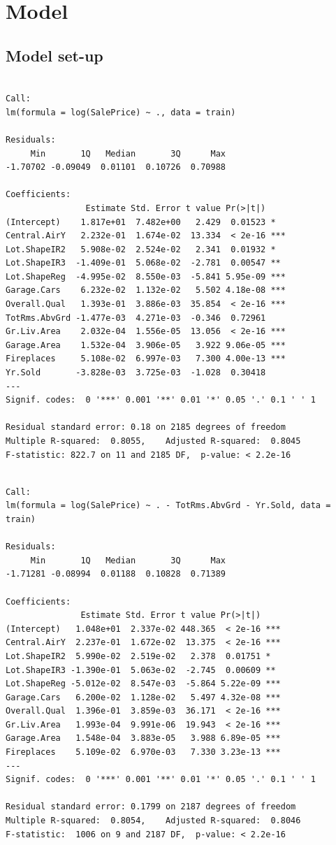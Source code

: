 \documentclass[
  letterpaper,
  DIV=11,
  numbers=noendperiod]{scrartcl}
\begin{document}
\section{Model}\label{model}

\subsection{Model set-up}\label{model-set-up}

\begin{verbatim}

Call:
lm(formula = log(SalePrice) ~ ., data = train)

Residuals:
     Min       1Q   Median       3Q      Max 
-1.70702 -0.09049  0.01101  0.10726  0.70988 

Coefficients:
                Estimate Std. Error t value Pr(>|t|)    
(Intercept)    1.817e+01  7.482e+00   2.429  0.01523 *  
Central.AirY   2.232e-01  1.674e-02  13.334  < 2e-16 ***
Lot.ShapeIR2   5.908e-02  2.524e-02   2.341  0.01932 *  
Lot.ShapeIR3  -1.409e-01  5.068e-02  -2.781  0.00547 ** 
Lot.ShapeReg  -4.995e-02  8.550e-03  -5.841 5.95e-09 ***
Garage.Cars    6.232e-02  1.132e-02   5.502 4.18e-08 ***
Overall.Qual   1.393e-01  3.886e-03  35.854  < 2e-16 ***
TotRms.AbvGrd -1.477e-03  4.271e-03  -0.346  0.72961    
Gr.Liv.Area    2.032e-04  1.556e-05  13.056  < 2e-16 ***
Garage.Area    1.532e-04  3.906e-05   3.922 9.06e-05 ***
Fireplaces     5.108e-02  6.997e-03   7.300 4.00e-13 ***
Yr.Sold       -3.828e-03  3.725e-03  -1.028  0.30418    
---
Signif. codes:  0 '***' 0.001 '**' 0.01 '*' 0.05 '.' 0.1 ' ' 1

Residual standard error: 0.18 on 2185 degrees of freedom
Multiple R-squared:  0.8055,    Adjusted R-squared:  0.8045 
F-statistic: 822.7 on 11 and 2185 DF,  p-value: < 2.2e-16
\end{verbatim}

\begin{verbatim}

Call:
lm(formula = log(SalePrice) ~ . - TotRms.AbvGrd - Yr.Sold, data = train)

Residuals:
     Min       1Q   Median       3Q      Max 
-1.71281 -0.08994  0.01188  0.10828  0.71389 

Coefficients:
               Estimate Std. Error t value Pr(>|t|)    
(Intercept)   1.048e+01  2.337e-02 448.365  < 2e-16 ***
Central.AirY  2.237e-01  1.672e-02  13.375  < 2e-16 ***
Lot.ShapeIR2  5.990e-02  2.519e-02   2.378  0.01751 *  
Lot.ShapeIR3 -1.390e-01  5.063e-02  -2.745  0.00609 ** 
Lot.ShapeReg -5.012e-02  8.547e-03  -5.864 5.22e-09 ***
Garage.Cars   6.200e-02  1.128e-02   5.497 4.32e-08 ***
Overall.Qual  1.396e-01  3.859e-03  36.171  < 2e-16 ***
Gr.Liv.Area   1.993e-04  9.991e-06  19.943  < 2e-16 ***
Garage.Area   1.548e-04  3.883e-05   3.988 6.89e-05 ***
Fireplaces    5.109e-02  6.970e-03   7.330 3.23e-13 ***
---
Signif. codes:  0 '***' 0.001 '**' 0.01 '*' 0.05 '.' 0.1 ' ' 1

Residual standard error: 0.1799 on 2187 degrees of freedom
Multiple R-squared:  0.8054,    Adjusted R-squared:  0.8046 
F-statistic:  1006 on 9 and 2187 DF,  p-value: < 2.2e-16
\end{verbatim}
\end{document}
